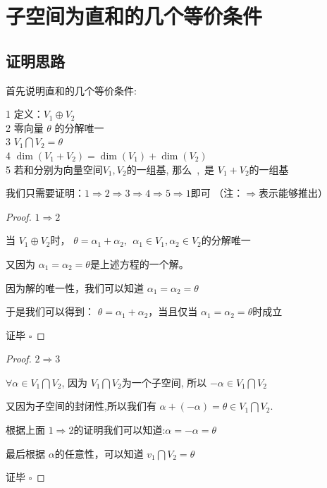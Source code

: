 \section{子空间为直和的几个等价条件}

\subsection{证明思路}
首先说明直和的几个等价条件:

\begin{framed}
\noindent
\num{1} 定义：$V_1\oplus V_2$\\
\num{2} 零向量 $\theta$ 的分解唯一\\
\num{3} $V_1\bigcap V_2=\theta$\\
\num{4} $\dim(V_1+V_2)=\dim(V_1)+\dim(V_2)$\\
\num{5} 若\seq[n_1]{\alpha}和\seq[n_2]{\beta}分别为向量空间$V_1,V_2$的一组基,
        那么\seq[n_1]{\alpha}~,~\seq[n_2]{\beta}是 $V_1+V_2$的一组基
\end{framed} 

\bigskip
我们只需要证明：$1 \Rightarrow 2 \Rightarrow 3 \Rightarrow 4 \Rightarrow 5 \Rightarrow 1$即可
（注：$\Rightarrow $表示能够推出）

\begin{proof}{${1} \Rightarrow  {2}$}

   当 $V_1\oplus V_2$时， $\theta = \alpha_1 +\alpha_2, ~~\alpha_1 \in V_1,\alpha_2\in V_2$的分解唯一\par 
   又因为 $\alpha_1 = \alpha_2=\theta$是上述方程的一个解。\par 
   因为解的唯一性，我们可以知道 $\alpha_1=\alpha_2=\theta$\par
   于是我们可以得到： $\theta =\alpha_1+\alpha_2$，当且仅当 $\alpha_1=\alpha_2=\theta$时成立\par
   证毕 $\square$
\end{proof}

\begin{proof}{${2} \Rightarrow {3}$}

    $\forall \alpha \in V_1\bigcap V_2$, 因为 $V_1\bigcap V_2$为一个子空间, 所以 $-\alpha\in V_1\bigcap V_2$\par 
    又因为子空间的封闭性,所以我们有 $\alpha+(-\alpha)=\theta\in V_1\bigcap V_2$.\par 
    根据上面 ${1} \Rightarrow {2}$的证明我们可以知道:$\alpha =-\alpha=\theta$\par
    最后根据 $\alpha$的任意性，可以知道 $v_1 \bigcap V_2=\theta$\par 
    证毕 $\square$
\end{proof}

